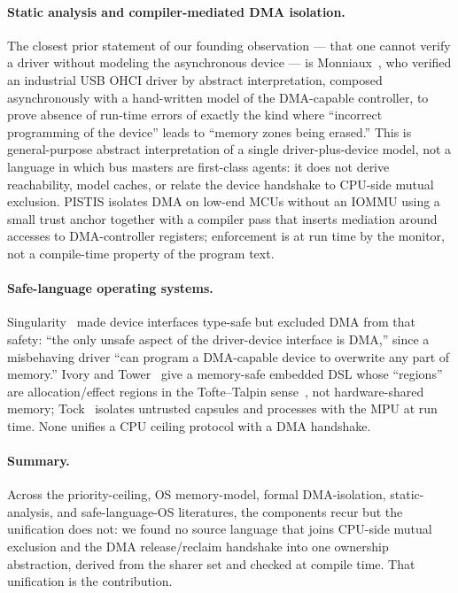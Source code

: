\documentclass[10pt,twocolumn]{article}
\begin{document}
\paragraph{Static analysis and compiler-mediated DMA isolation.} The closest
prior statement of our founding observation --- that one cannot verify a driver
without modeling the asynchronous device --- is Monniaux~\cite{monniaux2007}, who
verified an industrial USB OHCI driver by abstract interpretation, composed
asynchronously with a hand-written model of the DMA-capable controller, to prove
absence of run-time errors of exactly the kind where ``incorrect programming of
the device'' leads to ``memory zones being erased.'' This is general-purpose
abstract interpretation of a single driver-plus-device model, not a language in
which bus masters are first-class agents: it does not derive reachability, model
caches, or relate the device handshake to CPU-side mutual exclusion. PISTIS
\cite{pistis2022} isolates DMA on low-end MCUs without an IOMMU using a small
trust anchor together with a compiler pass that inserts mediation around accesses
to DMA-controller registers; enforcement is at run time by the monitor, not a
compile-time property of the program text.

\paragraph{Safe-language operating systems.} Singularity~\cite{singularity} made
device interfaces type-safe but excluded DMA from that safety: ``the only unsafe
aspect of the driver-device interface is DMA,'' since a misbehaving driver ``can
program a DMA-capable device to overwrite any part of memory.''
Ivory and Tower~\cite{ivory} give a memory-safe embedded DSL whose ``regions''
are allocation/effect regions in the Tofte--Talpin sense~\cite{toftetalpin}, not
hardware-shared
memory; Tock~\cite{tock} isolates untrusted capsules and processes with the MPU
at run time. None unifies a CPU ceiling protocol with a DMA handshake.

\paragraph{Summary.} Across the priority-ceiling, OS memory-model, formal
DMA-isolation, static-analysis, and safe-language-OS literatures, the components
recur but the unification does not: we found no source language that joins
CPU-side mutual exclusion and the DMA release/reclaim handshake into one
ownership abstraction, derived from the sharer set and checked at compile time.
That unification is the contribution.
\end{document}
